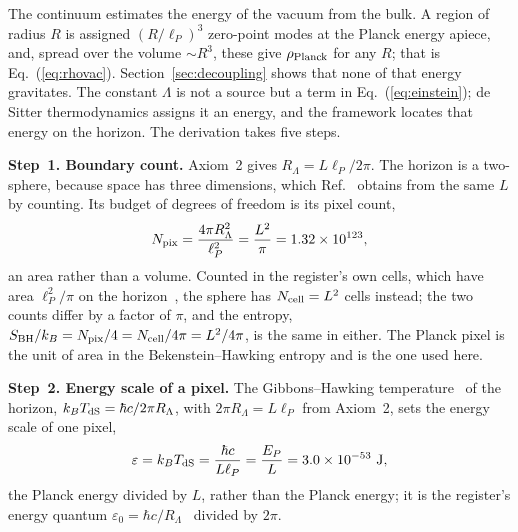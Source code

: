 \documentclass[aps,prd,twocolumn,superscriptaddress,nofootinbib,showkeys]{revtex4-2}
\begin{document}
The continuum estimates the energy of the vacuum from the bulk. A region of radius $R$ is assigned $(R/\ell_P)^3$ zero-point modes at the Planck energy apiece, and, spread over the volume $\sim R^3$, these give $\rho_{\rm Planck}$ for any $R$; that is Eq.~(\ref{eq:rhovac}). Section~\ref{sec:decoupling} shows that none of that energy gravitates. The constant $\Lambda$ is not a source but a term in Eq.~(\ref{eq:einstein}); de Sitter thermodynamics assigns it an energy, and the framework locates that energy on the horizon. The derivation takes five steps.

\textbf{Step~1. Boundary count.} Axiom~2 gives $R_\Lambda = L\ell_P/2\pi$. The horizon is a two-sphere, because space has three dimensions, which Ref.~\cite{korytko2026d} obtains from the same $L$ by counting. Its budget of degrees of freedom is its pixel count,
\begin{equation}
N_{\rm pix} = \frac{4\pi R_\Lambda^2}{\ell_P^2} = \frac{L^2}{\pi} = 1.32\times10^{123},
\label{eq:npix}
\end{equation}
an area rather than a volume. Counted in the register's own cells, which have area $\ell_P^2/\pi$ on the horizon~\cite{korytko2026d}, the sphere has $N_{\rm cell} = L^2$ cells instead; the two counts differ by a factor of $\pi$, and the entropy, $S_{\rm BH}/k_B = N_{\rm pix}/4 = N_{\rm cell}/4\pi = L^2/4\pi$, is the same in either. The Planck pixel is the unit of area in the Bekenstein--Hawking entropy and is the one used here.

\textbf{Step~2. Energy scale of a pixel.} The Gibbons--Hawking temperature~\cite{gibbons1977} of the horizon, $k_BT_{\rm dS} = \hbar c/2\pi R_\Lambda$, with $2\pi R_\Lambda = L\ell_P$ from Axiom~2, sets the energy scale of one pixel,
\begin{equation}
\varepsilon = k_BT_{\rm dS} = \frac{\hbar c}{L\ell_P} = \frac{E_P}{L} = 3.0\times10^{-53}~{\rm J},
\label{eq:eps}
\end{equation}
the Planck energy divided by $L$, rather than the Planck energy; it is the register's energy quantum $\varepsilon_0 = \hbar c/R_\Lambda$~\cite{korytko2026c} divided by $2\pi$.
\end{document}
